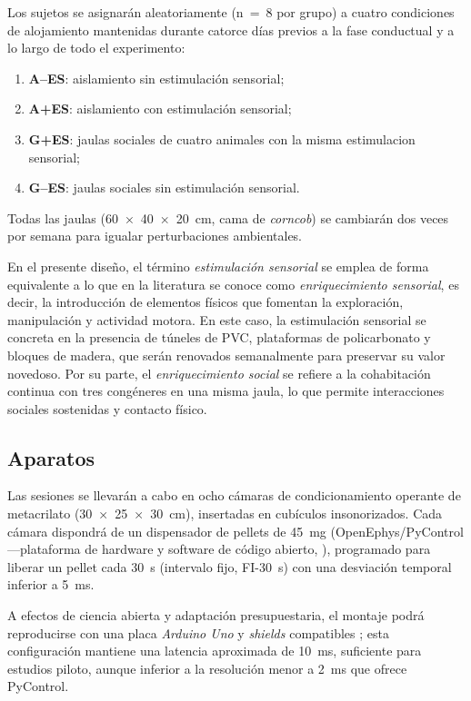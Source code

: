 \documentclass[12pt,a4paper]{article}
\begin{document}
\begin{multicols}{2}
Los sujetos se asignarán aleatoriamente (n~=~8 por grupo) a cuatro condiciones de alojamiento mantenidas durante catorce días previos a la fase conductual y a lo largo de todo el experimento: 
\begin{enumerate}
    \item \textbf{A--ES}: aislamiento sin estimulación sensorial;
    \item \textbf{A+ES}: aislamiento con estimulación sensorial;
    \item \textbf{G+ES}: jaulas sociales de cuatro animales con la misma estimulacion sensorial;
    \item \textbf{G--ES}: jaulas sociales sin estimulación sensorial.
\end{enumerate}
Todas las jaulas (60~×~40~×~20~cm, cama de \textit{corncob}) se cambiarán dos veces por semana para igualar perturbaciones ambientales.

En el presente diseño, el término \textit{estimulación sensorial} se emplea de forma equivalente a lo que en la literatura se conoce como \textit{enriquecimiento sensorial}, es decir, la introducción de elementos físicos que fomentan la exploración, manipulación y actividad motora. En este caso, la estimulación sensorial se concreta en la presencia de túneles de PVC, plataformas de policarbonato y bloques de madera, que serán renovados semanalmente para preservar su valor novedoso. Por su parte, el \textit{enriquecimiento social} se refiere a la cohabitación continua con tres congéneres en una misma jaula, lo que permite interacciones sociales sostenidas y contacto físico.

\subsection*{Aparatos}

Las sesiones se llevarán a cabo en ocho cámaras de condicionamiento operante de metacrilato (30~×~25~×~30~cm), insertadas en cubículos insonorizados. Cada cámara dispondrá de un dispensador de pellets de 45~mg (OpenEphys/PyControl —plataforma de hardware y software de código abierto, \citep{PelletDispenserGitHub}), programado para liberar un pellet cada 30~s (intervalo fijo, FI-30~s) con una desviación temporal inferior a 5~ms.

A efectos de ciencia abierta y adaptación presupuestaria, el montaje podrá reproducirse con una placa \textit{Arduino Uno} y \textit{shields} compatibles \citep{Arduino2024}; esta configuración mantiene una latencia aproximada de 10~ms, suficiente para estudios piloto, aunque inferior a la resolución menor a 2~ms que ofrece PyControl.


\end{multicols}
\end{document}
